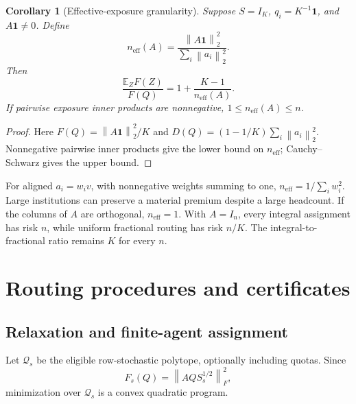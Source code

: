 \documentclass[11pt]{article}
\newtheorem{corollary}[theorem]{Corollary}
\newcommand{\E}{\mathbb{E}}
\newcommand{\one}{\mathbf{1}}
\newcommand{\norm}[1]{\left\lVert#1\right\rVert}
\begin{document}
\begin{corollary}[Effective-exposure granularity]\label{cor:neff}
Suppose \(S=I_K\), \(q_i=K^{-1}\one\), and \(A\one\ne0\). Define
\begin{equation}
 n_{\mathrm{eff}}(A)=\frac{\norm{A\one}_2^2}{\sum_i\norm{a_i}_2^2}.
 \label{eq:neff}
\end{equation}
Then
\begin{equation}
 \frac{\E_ZF(Z)}{F(Q)}=1+\frac{K-1}{n_{\mathrm{eff}}(A)}.
 \label{eq:relativepremium}
\end{equation}
If pairwise exposure inner products are nonnegative, \(1\le n_{\mathrm{eff}}(A)\le n\).
\end{corollary}
\begin{proof}
Here \(F(Q)=\norm{A\one}_2^2/K\) and
\(D(Q)=(1-1/K)\sum_i\norm{a_i}_2^2\).
Nonnegative pairwise inner products give the lower bound on \(n_{\mathrm{eff}}\); Cauchy--Schwarz gives the upper bound.
\end{proof}
For aligned \(a_i=w_iv\), with nonnegative weights summing to one, \(n_{\mathrm{eff}}=1/\sum_iw_i^2\). Large institutions can preserve a material premium despite a large headcount. If the columns of \(A\) are orthogonal, \(n_{\mathrm{eff}}=1\). With \(A=I_n\), every integral assignment has risk \(n\), while uniform fractional routing has risk \(n/K\). The integral-to-fractional ratio remains \(K\) for every \(n\).

\section{Routing procedures and certificates}
\subsection{Relaxation and finite-agent assignment}
Let \(\mathcal Q_s\) be the eligible row-stochastic polytope, optionally including quotas. Since
\begin{equation}
 F_s(Q)=\norm{AQS_s^{1/2}}_F^2,
 \label{eq:convex}
\end{equation}
minimization over \(\mathcal Q_s\) is a convex quadratic program.
\end{document}
